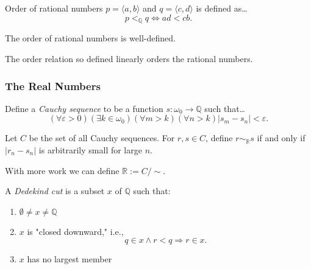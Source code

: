 \noindent Order of rational numbers $p = \langle a, b \rangle$ and $q = \langle c, d \rangle$ is defined as\dots
$$p <_{\mathbb{Q}} q \Leftrightarrow ad < cb.$$

\begin{lemma}
The order of rational numbers is well-defined.
\end{lemma}

\noindent The order relation so defined linearly orders the rational numbers.

\subsubsection{The Real Numbers}\label{realnumbers}

\label{realnumberswithcauchysequences}

Define a \emph{Cauchy sequence} to be a function $s: \omega_0 \rightarrow \mathbb{Q}$ such that\dots
$$(\forall \varepsilon > 0)(\exists k \in \omega_0)(\forall m > k)(\forall n > k) |s_m - s_n| < \varepsilon.$$

\noindent Let $C$ be the set of all Cauchy sequences. For $r,s \in C$, define $r \sim_{\mathbb{R}} s$ if and only if $|r_n - s_n|$
is arbitrarily small for large $n$.\newline

\noindent With more work we can define $\mathbb{R} := C / \sim$.

\label{realnumberswithcauchysequence}

A \emph{Dedekind cut} is a subset $x$ of $\mathbb{Q}$ such that:
\begin{enumerate}
  \item $\emptyset \neq x \neq \mathbb{Q}$
  \item $x$ is "closed downward," i.e.,
		$$q \in x \land r < q \Rightarrow r \in x.$$
  \item $x$ has no largest member
\end{enumerate}